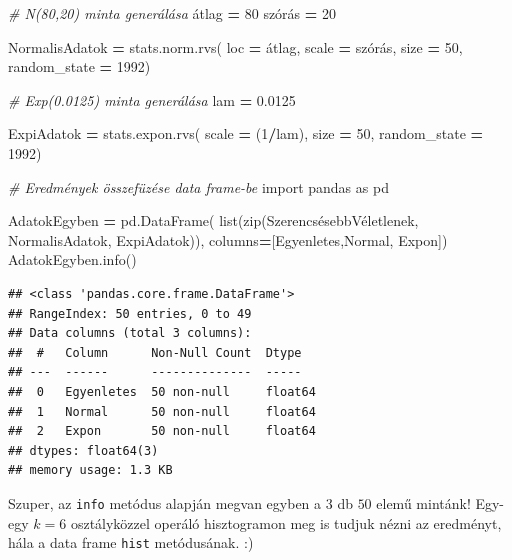 \documentclass[
]{book}
\newenvironment{Shaded}{\begin{snugshade}}{\end{snugshade}}
\newcommand{\BuiltInTok}[1]{#1}
\newcommand{\CommentTok}[1]{\textcolor[rgb]{0.56,0.35,0.01}{\textit{#1}}}
\newcommand{\DecValTok}[1]{\textcolor[rgb]{0.00,0.00,0.81}{#1}}
\newcommand{\FloatTok}[1]{\textcolor[rgb]{0.00,0.00,0.81}{#1}}
\newcommand{\ImportTok}[1]{#1}
\newcommand{\NormalTok}[1]{#1}
\newcommand{\OperatorTok}[1]{\textcolor[rgb]{0.81,0.36,0.00}{\textbf{#1}}}
\newcommand{\StringTok}[1]{\textcolor[rgb]{0.31,0.60,0.02}{#1}}
\begin{document}
\begin{Shaded}
\begin{Highlighting}[]
\CommentTok{\# N(80,20) minta generálása}
\NormalTok{átlag }\OperatorTok{=} \DecValTok{80}
\NormalTok{szórás }\OperatorTok{=} \DecValTok{20}

\NormalTok{NormalisAdatok }\OperatorTok{=}\NormalTok{ stats.norm.rvs(}
\NormalTok{  loc }\OperatorTok{=}\NormalTok{ átlag,}
\NormalTok{  scale }\OperatorTok{=}\NormalTok{ szórás,}
\NormalTok{  size }\OperatorTok{=} \DecValTok{50}\NormalTok{,}
\NormalTok{  random\_state }\OperatorTok{=} \DecValTok{1992}\NormalTok{)}
  
\CommentTok{\# Exp(0.0125) minta generálása}
\NormalTok{lam }\OperatorTok{=} \FloatTok{0.0125}

\NormalTok{ExpiAdatok }\OperatorTok{=}\NormalTok{ stats.expon.rvs(}
\NormalTok{  scale }\OperatorTok{=}\NormalTok{ (}\DecValTok{1}\OperatorTok{/}\NormalTok{lam),}
\NormalTok{  size }\OperatorTok{=} \DecValTok{50}\NormalTok{,}
\NormalTok{  random\_state }\OperatorTok{=} \DecValTok{1992}\NormalTok{)}

\CommentTok{\# Eredmények összefüzése data frame{-}be}
\ImportTok{import}\NormalTok{ pandas }\ImportTok{as}\NormalTok{ pd}

\NormalTok{AdatokEgyben }\OperatorTok{=}\NormalTok{ pd.DataFrame(}
  \BuiltInTok{list}\NormalTok{(}\BuiltInTok{zip}\NormalTok{(SzerencsésebbVéletlenek, NormalisAdatok, ExpiAdatok)),}
\NormalTok{  columns}\OperatorTok{=}\NormalTok{[}\StringTok{\textquotesingle{}Egyenletes\textquotesingle{}}\NormalTok{,}\StringTok{\textquotesingle{}Normal\textquotesingle{}}\NormalTok{, }\StringTok{\textquotesingle{}Expon\textquotesingle{}}\NormalTok{])}
\NormalTok{AdatokEgyben.info()}
\end{Highlighting}
\end{Shaded}

\begin{verbatim}
## <class 'pandas.core.frame.DataFrame'>
## RangeIndex: 50 entries, 0 to 49
## Data columns (total 3 columns):
##  #   Column      Non-Null Count  Dtype  
## ---  ------      --------------  -----  
##  0   Egyenletes  50 non-null     float64
##  1   Normal      50 non-null     float64
##  2   Expon       50 non-null     float64
## dtypes: float64(3)
## memory usage: 1.3 KB
\end{verbatim}

Szuper, az \texttt{info} metódus alapján megvan egyben a \(3\) db \(50\) elemű mintánk! Egy-egy \(k=6\) osztályközzel operáló hisztogramon meg is tudjuk nézni az eredményt, hála a data frame \texttt{hist} metódusának. :)
\end{document}
